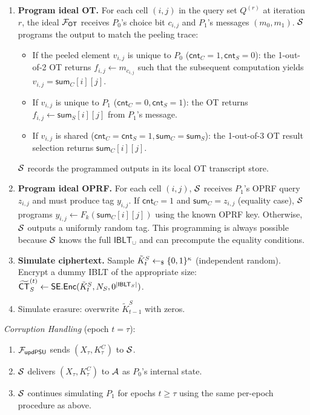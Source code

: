 \begin{framed}
\begin{enumerate}
\item \textbf{Program ideal OT.} For each cell $(i,j)$ in the query set
$Q^{(r)}$ at iteration $r$, the ideal $\mathcal{F}_{\mathsf{OT}}$ receives $P_0$'s
choice bit $c_{i,j}$ and $P_1$'s messages $(m_0, m_1)$. $\mathcal{S}$ programs the
output to match the peeling trace:
\begin{itemize}
\item If the peeled element $v_{i,j}$ is unique to $P_0$
($\mathsf{cnt}_C = 1, \mathsf{cnt}_S = 0$): the 1-out-of-2 OT returns
$f_{i,j} \leftarrow m_{c_{i,j}}$ such that the subsequent computation
yields $v_{i,j} = \mathsf{sum}_C[i][j]$.
\item If $v_{i,j}$ is unique to $P_1$
($\mathsf{cnt}_C = 0, \mathsf{cnt}_S = 1$): the OT returns
$f_{i,j} \leftarrow \mathsf{sum}_S[i][j]$ from $P_1$'s message.
\item If $v_{i,j}$ is shared ($\mathsf{cnt}_C = \mathsf{cnt}_S = 1,
\mathsf{sum}_C = \mathsf{sum}_S$): the 1-out-of-3 OT result selection
returns $\mathsf{sum}_C[i][j]$.
\end{itemize}
$\mathcal{S}$ records the programmed outputs in its local OT transcript store.

\item \textbf{Program ideal OPRF.} For each cell $(i,j)$, $\mathcal{S}$ receives
$P_1$'s OPRF query $z_{i,j}$ and must produce tag $y_{i,j}$. If
$\mathsf{cnt}_C = 1$ and $\mathsf{sum}_C = z_{i,j}$ (equality case), $\mathcal{S}$
programs $y_{i,j} \leftarrow F_k(\mathsf{sum}_C[i][j])$ using the known
OPRF key. Otherwise, $\mathcal{S}$ outputs a uniformly random tag. This
programming is always possible because $\mathcal{S}$ knows the full
$\mathsf{IBLT}_\cup$ and can precompute the equality conditions.

\item \textbf{Simulate ciphertext.} Sample $\tilde{K}^S_t \leftarrow_{\$}
\{0,1\}^\kappa$ (independent random). Encrypt a dummy IBLT of the
appropriate size: $\widetilde{\mathsf{CT}}^{(t)}_S \leftarrow
\mathsf{SE}.\mathsf{Enc}(\tilde{K}^S_t, N_S, 0^{|\mathsf{IBLT}_S|})$.

\item Simulate erasure: overwrite $\tilde{K}^S_{t-1}$ with zeros.
\end{enumerate}

\smallskip\noindent\textit{Corruption Handling} (epoch $t = \tau$):
\begin{enumerate}
\item $\mathcal{F}_{\mathsf{updPSU}}$ sends $(X_\tau, K^C_\tau)$ to $\mathcal{S}$.
\item $\mathcal{S}$ delivers $(X_\tau, K^C_\tau)$ to $\mathcal{A}$ as $P_0$'s internal
state.
\item $\mathcal{S}$ continues simulating $P_1$ for epochs $t \geq \tau$ using the
same per-epoch procedure as above.
\end{enumerate}
\end{framed}

